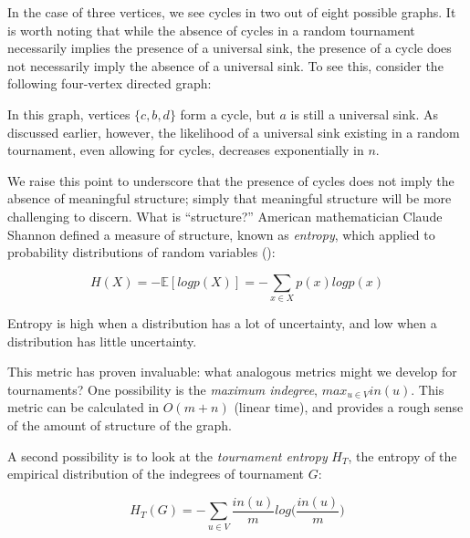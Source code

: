 In the case of three vertices, we see cycles in two out of eight possible graphs.
It is worth noting that while the absence of cycles in a random tournament necessarily implies the presence of a universal sink, the presence of a cycle does not necessarily imply the absence of a universal sink.
To see this, consider the following four-vertex directed graph:

\begin{center}
\end{center}

In this graph, vertices $\{c, b, d\}$ form a cycle, but $a$ is still a universal sink.
As discussed earlier, however, the likelihood of a universal sink existing in a random tournament, even allowing for cycles, decreases exponentially in $n$.

\bigskip

We raise this point to underscore that the presence of cycles does not imply the absence of meaningful structure; simply that meaningful structure will be more challenging to discern.
What is ``structure?''
American mathematician Claude Shannon defined a measure of structure, known as \textit{entropy}, which applied to probability distributions of random variables (\cite{cover}):

\[
H(X) = -\mathbb{E}[logp(X)] = -\sum_{x \in X}p(x)logp(x)
\]

Entropy is high when a distribution has a lot of uncertainty, and low when a distribution has little uncertainty.

This metric has proven invaluable: what analogous metrics might we develop for tournaments?
One possibility is the \textit{maximum indegree}, $max_{u \in V}in(u)$.
This metric can be calculated in $O(m + n)$ (linear time), and provides a rough sense of the amount of structure of the graph.

A second possibility is to look at the \textit{tournament entropy} $H_T$, the entropy of the empirical distribution of the indegrees of tournament $G$:

\[
H_T(G) = -\sum_{u \in V} \frac{in(u)}{m}log\bigg(\frac{in(u)}{m}\bigg)
\]


